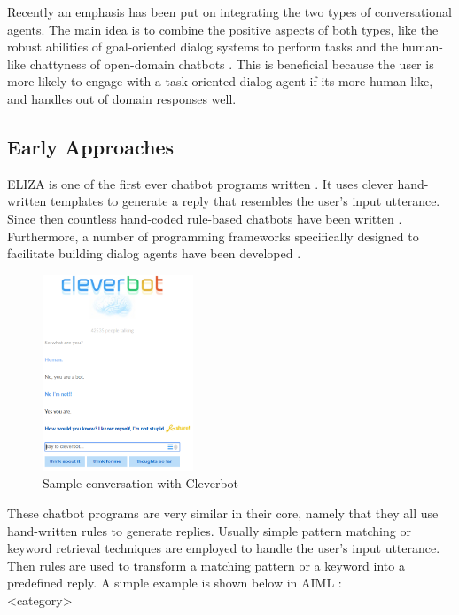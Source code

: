\documentclass[12pt]{article}
\begin{document}
Recently an emphasis has been put on integrating the two types of conversational agents. The main idea is to combine the positive aspects of both types, like the robust abilities of goal-oriented dialog systems to perform tasks and the human-like chattyness of open-domain chatbots \cite{Zhao:2017,Yu:2017,Serban:2017}. This is beneficial because the user is more likely to engage with a task-oriented dialog agent if its more human-like, and handles out of domain responses well.

\subsection{Early Approaches} \label{ssec:22}

ELIZA is one of the first ever chatbot programs written \cite{Weizenbaum:1966}. It uses clever hand-written templates to generate a reply that resembles the user's input utterance. Since then countless hand-coded rule-based chatbots have been written \cite{Wallace:2009,Cleverbot:2017,Mitsuku:2017}. Furthermore, a number of programming frameworks specifically designed to facilitate building dialog agents have been developed \cite{Marietto:2013,Microsoft:2017}.

\begin{figure}[H]
	\centering
	\includegraphics[width=0.4\textwidth]{pics/cleverbot.png}
	\caption{Sample conversation with Cleverbot \cite{Cleverbot:2017}}
	\label{fig:22a}
\end{figure}


These chatbot programs are very similar in their core, namely that they all use hand-written rules to generate replies. Usually simple pattern matching or keyword retrieval techniques are employed to handle the user's input utterance. Then rules are used to transform a matching pattern or a keyword into a predefined reply.
A simple example is shown below in AIML \cite{Marietto:2013}:\\
{\color{OliveGreen}\textless category\textgreater}
\end{document}
